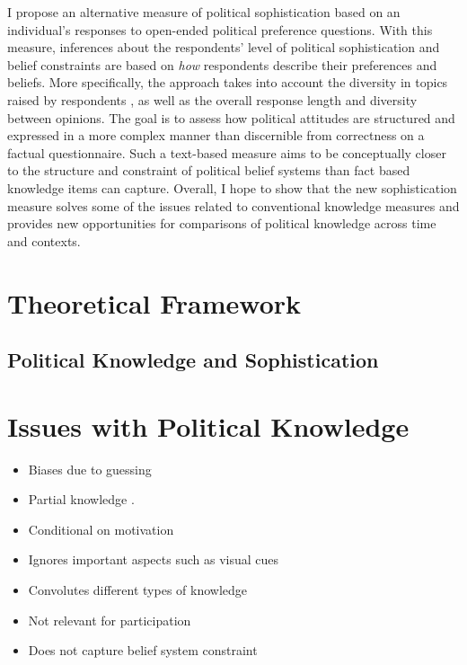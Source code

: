 \documentclass[12pt]{article}
\begin{document}
I propose an alternative measure of political sophistication based on an individual's responses to open-ended political preference questions. With this measure, inferences about the respondents' level of political sophistication and belief constraints are based on \textsl{how} respondents describe their preferences and beliefs. More specifically, the approach takes into account the diversity in topics raised by respondents \citep[measured using structural topic models][]{roberts2014structural}, as well as the overall response length and diversity between opinions. The goal is to assess how political attitudes are structured and expressed in a more complex manner than discernible from correctness on a factual questionnaire. Such a text-based measure aims to be conceptually closer to the structure and constraint of political belief systems 
\citep[see for example][]{tetlock1983cognitive,luskin1987measuring} than fact based knowledge items can capture. Overall, I hope to show that the new sophistication measure solves some of the issues related to conventional knowledge measures and provides new opportunities for comparisons of political knowledge across time and contexts.


\section{Theoretical Framework}

\subsection{Political Knowledge and Sophistication}

\section*{Issues with Political Knowledge}
\begin{itemize}
   \item Biases due to guessing \citep[e.g.][]{mondak2004knowledge}
   \item Partial knowledge \citep[e.g.][]{debell2013harder}.
   \item Conditional on motivation \citep[e.g.][]{prior2008money}
   \item Ignores important aspects such as visual cues \citep{prior2014visual}
   \item Convolutes different types of knowledge \citep{barabas2014question}
   \item Not relevant for participation \citep{lupia2006elitism}
   \item Does not capture belief system constraint \citep{luskin1987measuring,tetlock1983cognitive}
\end{itemize}
\end{document}
